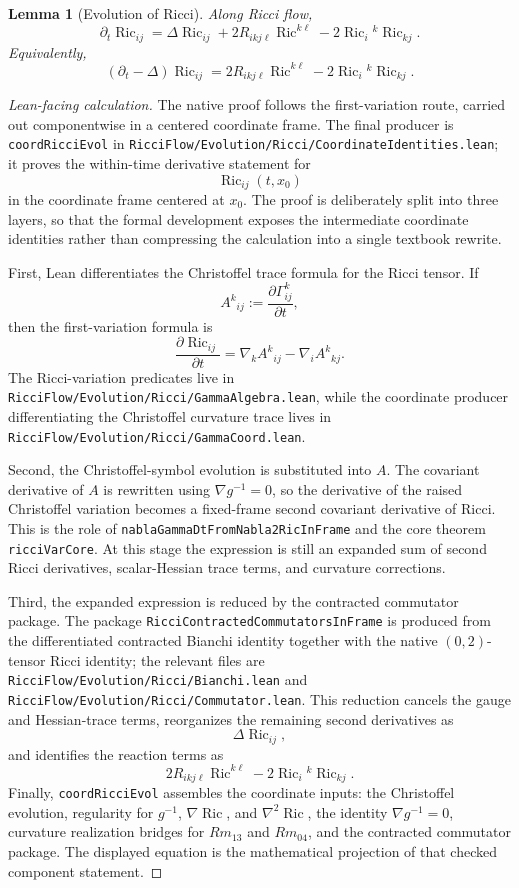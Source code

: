 \documentclass[11pt]{article}
\theoremstyle{plain}
\newtheorem{lemma}[theorem]{Lemma}
\theoremstyle{definition}
\theoremstyle{remark}
\newcommand{\Ric}{\operatorname{Ric}}
\newcommand{\leanref}[1]{\nolinkurl{#1}}
\newcommand{\leanfile}[1]{\nolinkurl{#1}}
\newcommand{\rffile}[1]{\leanfile{#1}}
\begin{document}
\begin{lemma}[Evolution of Ricci]
\label{lem:evol-ricci}
Along Ricci flow,
\[
\partial_t\Ric_{ij}
=
\Delta\Ric_{ij}
+2R_{ikj\ell}\Ric^{k\ell}
-2\Ric_i{}^k\Ric_{kj}.
\]
Equivalently,
\[
(\partial_t-\Delta)\Ric_{ij}
=
2R_{ikj\ell}\Ric^{k\ell}
-2\Ric_i{}^k\Ric_{kj}.
\]
\end{lemma}

\begin{proof}[Lean-facing calculation]
The native proof follows the first-variation route, carried out componentwise
in a centered coordinate frame.  The final producer is
\leanref{coordRicciEvol} in
\rffile{RicciFlow/Evolution/Ricci/CoordinateIdentities.lean}; it proves the
within-time derivative statement for
\[
  \Ric_{ij}(t,x_0)
\]
in the coordinate frame centered at \(x_0\).  The proof is deliberately split
into three layers, so that the formal development exposes the intermediate
coordinate identities rather than compressing the calculation into a single
textbook rewrite.

First, Lean differentiates the Christoffel trace formula for the Ricci tensor.
If
\[
  A^k{}_{ij}:=\frac{\partial\Gamma^k_{ij}}{\partial t},
\]
then the first-variation formula is
\[
  \frac{\partial\Ric_{ij}}{\partial t}
  =
  \nabla_k A^k{}_{ij}-\nabla_i A^k{}_{kj}.
\]
The Ricci-variation predicates live in
\rffile{RicciFlow/Evolution/Ricci/GammaAlgebra.lean}, while the coordinate
producer differentiating the Christoffel curvature trace lives in
\rffile{RicciFlow/Evolution/Ricci/GammaCoord.lean}.

Second, the Christoffel-symbol evolution is substituted into \(A\).  The
covariant derivative of \(A\) is rewritten using \(\nabla g^{-1}=0\), so the
derivative of the raised Christoffel variation becomes a fixed-frame second
covariant derivative of Ricci.  This is the role of
\leanref{nablaGammaDtFromNabla2RicInFrame} and the core theorem
\leanref{ricciVarCore}.  At this stage the expression is still an expanded sum
of second Ricci derivatives, scalar-Hessian trace terms, and curvature
corrections.

Third, the expanded expression is reduced by the contracted commutator package.
The package \leanref{RicciContractedCommutatorsInFrame} is produced from the
differentiated contracted Bianchi identity together with the native
\((0,2)\)-tensor Ricci identity; the relevant files are
\rffile{RicciFlow/Evolution/Ricci/Bianchi.lean} and
\rffile{RicciFlow/Evolution/Ricci/Commutator.lean}.  This reduction cancels the
gauge and Hessian-trace terms, reorganizes the remaining second derivatives as
\[
  \Delta\Ric_{ij},
\]
and identifies the reaction terms as
\[
  2R_{ikj\ell}\Ric^{k\ell}-2\Ric_i{}^k\Ric_{kj}.
\]
Finally, \leanref{coordRicciEvol} assembles the coordinate inputs: the
Christoffel evolution, regularity for \(g^{-1}\), \(\nabla\Ric\), and
\(\nabla^2\Ric\), the identity \(\nabla g^{-1}=0\), curvature realization
bridges for \(Rm_{13}\) and \(Rm_{04}\), and the contracted commutator package.
The displayed equation is the mathematical projection of that checked component
statement.
\end{proof}
\end{document}
